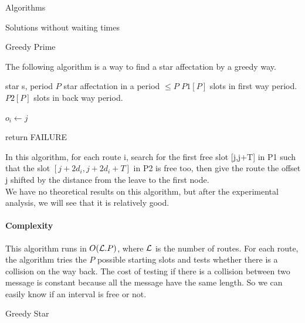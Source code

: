 \documentclass[a4paper,10pt]{report}
\begin{document}
\begin{chapter}{Algorithms}
\begin{section}{Solutions without waiting times}
\begin{subsection}{Greedy Prime}

The following algorithm is a way to find a star affectation by a greedy way.

\begin{algorithm}[H]
\caption{Greedy Prime assignment}
\begin{algorithmic}
\REQUIRE star s, period $P$
\ENSURE star affectation in a period $\leq P$ 
\STATE $P1[P]$ slots in first way period.
\STATE $P2[P]$ slots in back way period.




\STATE $o_i \leftarrow j$
\ENDIF

\ENDIF
{}
\STATE return FAILURE
\ENDIF
\ENDFOR

\ENDFOR

\end{algorithmic}
\end{algorithm}


In this algorithm, for each route i, search for the first free slot [j,j+T] in P1 such that the slot $[j + 2d_i,j + 2d_i+T]$ in P2 is free too,
then give the route the offset j shifted by the distance from the leave to the first node.\\

We have no theoretical results on this algorithm, but after the experimental analysis, we will see that it is relatively good.


\paragraph{Complexity}
This algorithm runs in $O({\cal L}.P)$, where ${\cal L}$ is the number of routes. For each route, the algorithm tries the $P$ possible
starting slots and tests whether there is a collision on the way back.
The cost of testing if there is a collision between two message is constant because all the message have the same length. So we can easily know if an interval is free or not.

\end{subsection}




\begin{subsection}{Greedy Star}
%  
% 
%  
%  



\end{subsection}
\end{section}
\end{chapter}
\end{document}
